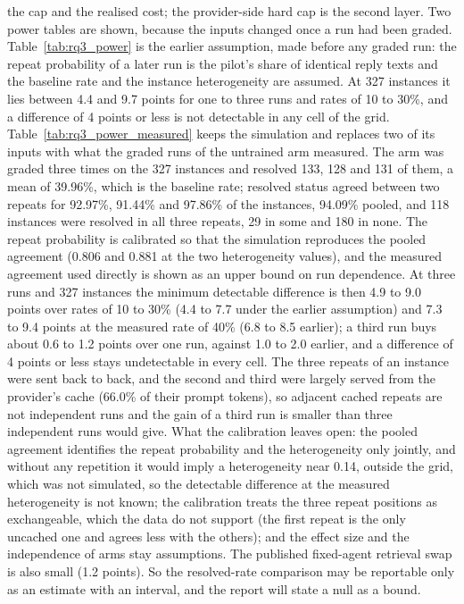 \documentclass[10pt,twocolumn]{article}
\begin{document}
the cap and the realised cost; the provider-side hard cap is the second layer. %
Two power tables are shown, because the inputs changed once a run had been graded. Table~\ref{tab:rq3_power} is the earlier assumption, made before any graded run: the repeat probability of a later run is the pilot's
share of identical reply texts and the baseline rate and the instance heterogeneity are assumed. At 327 instances it lies between 4.4 and 9.7 points for one to three runs and rates of 10 to 30\%, and a difference of 4 points or less is not
detectable in any cell of the grid. %
Table~\ref{tab:rq3_power_measured} keeps the simulation and replaces two of its inputs with what the graded runs of the untrained arm measured. The arm was graded three times on the 327 instances and resolved 133, 128 and 131 of them, a mean of 39.96\%, which is the baseline rate;
resolved status agreed between two repeats for 92.97\%, 91.44\% and 97.86\% of the instances, 94.09\% pooled, and 118 instances were resolved in all three repeats, 29 in some and 180 in none. %
The repeat probability is calibrated so that the simulation reproduces the pooled agreement (0.806 and 0.881 at the two heterogeneity values), and the measured agreement used directly is shown as an upper bound on run dependence. %
At three runs and 327 instances the minimum detectable difference is then 4.9 to 9.0 points over rates of 10 to 30\% (4.4 to 7.7 under the earlier assumption) and 7.3 to 9.4 points at the measured rate of 40\% (6.8 to 8.5 earlier); %
a third run buys about 0.6 to 1.2 points over one run, against 1.0 to 2.0 earlier, and a difference of 4 points or less stays undetectable in every cell. %
The three repeats of an instance were sent back to back, and the second and third were largely served from the provider's cache (66.0\% of their prompt tokens), so adjacent cached repeats are not independent runs and the gain of a third run is smaller than three independent runs would give. %
What the calibration leaves open: the pooled agreement identifies the repeat probability and the heterogeneity only jointly, and without any repetition it would imply a heterogeneity near 0.14, outside the grid, which was not simulated, so the detectable difference at the measured heterogeneity is not known;
the calibration treats the three repeat positions as exchangeable, which the data do not support (the first repeat is the only uncached one and agrees less with the others); and the effect size and the independence of arms stay assumptions. %
The published fixed-agent retrieval swap is also small (1.2 points). %
So the resolved-rate comparison may be reportable only as an estimate with an interval, and the report will state a null as a bound.
\end{document}
